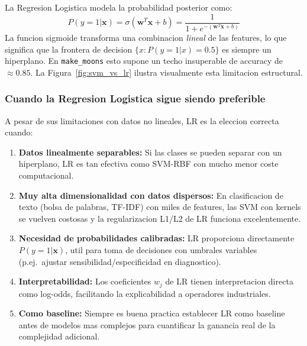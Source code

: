 \documentclass[12pt,a4paper]{article}
\begin{document}
\begin{tcolorbox}[resultbox, title={Analisis: Mejora del +10\%}]
  La Regresion Logistica modela la probabilidad posterior como:
  \begin{equation}
    P(y=1|\mathbf{x}) = \sigma(\mathbf{w}^T\mathbf{x} + b) = \frac{1}{1+e^{-(\mathbf{w}^T\mathbf{x}+b)}}
    \label{eq:lr}
  \end{equation}
  La funcion sigmoide transforma una combinacion \textit{lineal} de las features, lo que significa
  que la frontera de decision $\{x : P(y=1|x) = 0.5\}$ es siempre un hiperplano. En
  \texttt{make\_moons} esto supone un techo insuperable de accuracy de $\approx 0.85$.
  La Figura~\ref{fig:svm_vs_lr} ilustra visualmente esta limitacion estructural.
\end{tcolorbox}

\subsubsection*{Cuando la Regresion Logistica sigue siendo preferible}

A pesar de sus limitaciones con datos no lineales, LR es la eleccion correcta cuando:

\begin{enumerate}[label=\textbf{\arabic*.}]
  \item \textbf{Datos linealmente separables:} Si las clases se pueden separar con un hiperplano,
    LR es tan efectiva como SVM-RBF con mucho menor coste computacional.
  \item \textbf{Muy alta dimensionalidad con datos dispersos:} En clasificacion de texto (bolsa de
    palabras, TF-IDF) con miles de features, las SVM con kernels se vuelven costosas y la
    regularizacion L1/L2 de LR funciona excelentemente.
  \item \textbf{Necesidad de probabilidades calibradas:} LR proporciona directamente
    $P(y=1|\mathbf{x})$, util para toma de decisiones con umbrales variables (p.ej.\ ajustar
    sensibilidad/especificidad en diagnostico).
  \item \textbf{Interpretabilidad:} Los coeficientes $w_j$ de LR tienen interpretacion directa
    como log-odds, facilitando la explicabilidad a operadores industriales.
  \item \textbf{Como baseline:} Siempre es buena practica establecer LR como baseline antes de
    modelos mas complejos para cuantificar la ganancia real de la complejidad adicional.
\end{enumerate}
\end{document}
